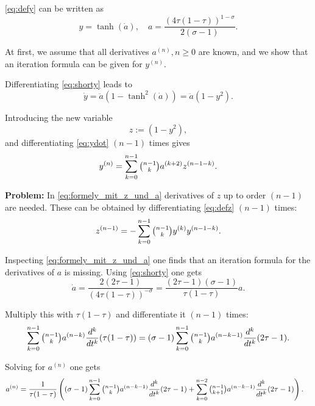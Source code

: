\documentclass[a4paper,12pt,headinclude=true,headsepline,parskip=half,DIV=12]{scrartcl}
\begin{document}
\begin{appendices}
  \autoref{eq:defy} can be written as
  \begin{equation}\label{eq:shorty}
    y=\tanh(\dot{a}),\quad a=\frac{(4\tau(1-\tau))^{1-\sigma}}{2(\sigma-1)}.
  \end{equation}

  At first, we assume that all derivatives $a^{(n)},n \ge 0$ are known, and we show that an iteration formula can be given for $y^{(n)}$.

  Differentiating \autoref{eq:shorty} leads to
  \begin{equation}\label{eq:ydot}
    \dot{y}=\ddot{a}(1-\tanh^2(\dot{a}))=\ddot{a}(1-y^2).
  \end{equation}

  Introducing the new variable
  \begin{equation} \label{eq:defz}
    z:=(1-y^2),
  \end{equation}
  and differentiating \autoref{eq:ydot} $(n-1)$ times gives
  \begin{equation} \label{eq:formely_mit_z_und_a}
    y^{(n)}=\sum_{k=0}^{n-1}\tbinom
    {n-1}{k}a^{(k+2)}z^{(n-1-k)}.
  \end{equation}


  \textbf{Problem:} In \autoref{eq:formely_mit_z_und_a} derivatives of $z$ up to order $(n-1)$ are needed. These can be
  obtained by differentiating \autoref{eq:defz} $(n-1)$ times:
  \begin{equation*}
    z^{(n-1)}=-\sum_{k=0}^{n-1}\tbinom
    {n-1}{k}y^{(k)}y^{(n-1-k)}.
  \end{equation*}


  Inspecting  \autoref{eq:formely_mit_z_und_a} one finds that an iteration formula for the derivatives of $a$ is missing. Using \autoref{eq:shorty} one gets
  \begin{equation*}
    \dot{a}=\frac{2(2\tau-1)}{(4\tau(1-\tau))^{-\sigma}}=\frac{(2\tau-1)(\sigma-1)}{\tau(1-\tau)}a.
  \end{equation*}

  Multiply this with ${\tau(1-\tau)}$ and differentiate it $(n-1)$ times:
  \begin{equation*}
    \sum_{k=0}^{n-1}\tbinom{n-1}{k} a^{(n-k)}\frac{d^k}{dt^k}(\tau(1-\tau))={(\sigma-1)}\sum_{k=0}^{n-1}\tbinom
    {n-1}{k} a^{(n-k-1)}\frac{d^k}{dt^k}(2\tau-1).
  \end{equation*}

  Solving for $a^{(n)}$ one gets
  \small
  \begin{align*}%
    a^{(n)} & =\frac{1}{\tau(1-\tau)}\left((\sigma-1)\sum_{k=0}^{n-1}\tbinom{n-1}{k} a^{(n-k-1)}\frac{d^k}{dt^k}(2\tau-1)+\sum_{k=0}^{n-2}\tbinom{n-1}{k+1} a^{(n-k-1)}\frac{d^k}{dt^k}(2\tau-1)\right).
  \end{align*}
  \normalsize


\end{appendices}
\end{document}
